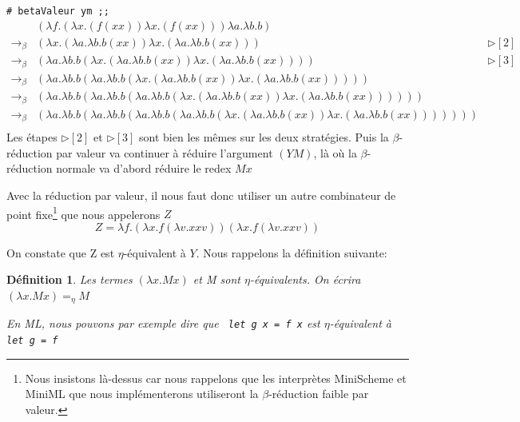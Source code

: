 \documentclass[11pt]{book}
\newtheorem{definition}{Définition}
\begin{document}
\verb+# betaValeur ym ;;+
$$
\begin{array}{lll}
 & (\lambda f . (\lambda x . (f(xx))\lambda x . (f(xx)))\lambda a . \lambda b . b)  &  \\
\rightarrow _\beta & (\lambda x . (\lambda a . \lambda b . b(xx))\lambda x . (\lambda a . \lambda b . b(xx))) & \triangleright [2]  \\
\rightarrow _\beta & (\lambda a . \lambda b . b(\lambda x . (\lambda a . \lambda b . b(xx))\lambda x . (\lambda a . \lambda b . b(xx)))) & \triangleright [3] \\
\rightarrow _\beta & (\lambda a . \lambda b . b(\lambda a . \lambda b . b(\lambda x . (\lambda a . \lambda b . b(xx))\lambda x . (\lambda a . \lambda b . b(xx)))))  & \\
\rightarrow _\beta & (\lambda a . \lambda b . b(\lambda a . \lambda b . b(\lambda a . \lambda b . b(\lambda x . (\lambda a . \lambda b . b(xx))\lambda x . (\lambda a . \lambda b . b(xx)))))) &  \\
\rightarrow _\beta & (\lambda a . \lambda b . b(\lambda a . \lambda b . b(\lambda a . \lambda b . b(\lambda a . \lambda b . b(\lambda x . (\lambda a . \lambda b . b(xx))\lambda x . (\lambda a . \lambda b . b(xx)))))))  & \\
\end{array}
$$
Les étapes  $\triangleright [2]$ et $\triangleright [3]$ sont bien les mêmes sur les deux stratégies. 
Puis la $\beta$-réduction par valeur va continuer à réduire l'argument
$(YM)$, là où la $\beta$-réduction normale va d'abord réduire le redex $Mx$

Avec la réduction par valeur, il nous faut donc utiliser un autre combinateur de point fixe\footnote{Nous insistons 
là-dessus car nous rappelons que les interprètes MiniScheme et MiniML que nous implémenterons utiliseront la $\beta$-réduction faible par valeur.}
 que nous appelerons $Z$ 
$$Z = \lambda f.(\lambda x.f(\lambda v.xxv))(\lambda x.f(\lambda v.xxv)) $$

On constate que Z est  $\eta$-équivalent à $Y$. Nous rappelons la définition suivante:


\begin{definition}
	
Les termes $(\lambda x.Mx)$ et M sont $\eta$-équivalents. On écrira $(\lambda x.Mx) =_\eta M$

En ML, nous pouvons par exemple dire que \verb+ let g x = f x+ est $\eta$-équivalent à \verb+ let g = f+
\end{definition}
\end{document}

